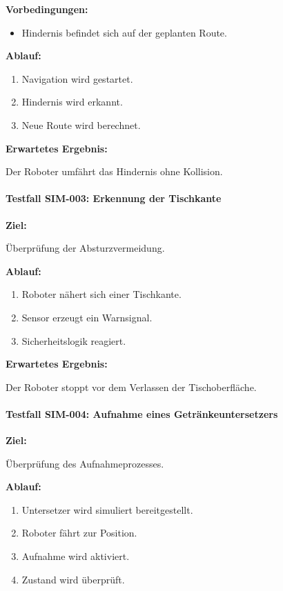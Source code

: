 \textbf{Vorbedingungen:}

\begin{itemize}
\tightlist
\item
  Hindernis befindet sich auf der geplanten Route.
\end{itemize}

\textbf{Ablauf:}

\begin{enumerate}
\def\labelenumi{\arabic{enumi}.}
\tightlist
\item
  Navigation wird gestartet.
\item
  Hindernis wird erkannt.
\item
  Neue Route wird berechnet.
\end{enumerate}

\textbf{Erwartetes Ergebnis:}

Der Roboter umfährt das Hindernis ohne Kollision.

\paragraph{Testfall SIM-003: Erkennung der
Tischkante}\label{testfall-sim-003-erkennung-der-tischkante}

\textbf{Ziel:}

Überprüfung der Absturzvermeidung.

\textbf{Ablauf:}

\begin{enumerate}
\def\labelenumi{\arabic{enumi}.}
\tightlist
\item
  Roboter nähert sich einer Tischkante.
\item
  Sensor erzeugt ein Warnsignal.
\item
  Sicherheitslogik reagiert.
\end{enumerate}

\textbf{Erwartetes Ergebnis:}

Der Roboter stoppt vor dem Verlassen der Tischoberfläche.

\paragraph{Testfall SIM-004: Aufnahme eines
Getränkeuntersetzers}\label{testfall-sim-004-aufnahme-eines-getruxe4nkeuntersetzers}

\textbf{Ziel:}

Überprüfung des Aufnahmeprozesses.

\textbf{Ablauf:}

\begin{enumerate}
\def\labelenumi{\arabic{enumi}.}
\tightlist
\item
  Untersetzer wird simuliert bereitgestellt.
\item
  Roboter fährt zur Position.
\item
  Aufnahme wird aktiviert.
\item
  Zustand wird überprüft.
\end{enumerate}

